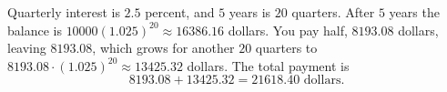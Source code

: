 Quarterly interest is $2.5$ percent, and $5$ years is $20$ quarters. After $5$ years the balance is $10000(1.025)^{20}\approx16386.16$ dollars. You pay half, $8193.08$ dollars, leaving $8193.08$, which grows for another $20$ quarters to $8193.08\cdot(1.025)^{20}\approx13425.32$ dollars. The total payment is
\[
8193.08+13425.32=\boxed{21618.40\text{ dollars}}.
\]
